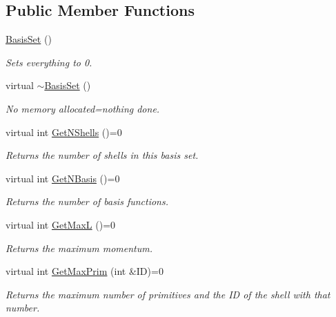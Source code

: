 \subsection*{Public Member Functions}
\begin{DoxyCompactItemize}
\item 
\hyperlink{classJKBuilder_1_1BasisSet_a902600fb65d5c4d7f7041316b1845b07}{BasisSet} ()
\begin{DoxyCompactList}\small\item\em Sets everything to 0. \item\end{DoxyCompactList}\item 
virtual \hyperlink{classJKBuilder_1_1BasisSet_acd6bebfe86051930ab0931d7d2486cce}{$\sim$BasisSet} ()
\begin{DoxyCompactList}\small\item\em No memory allocated=nothing done. \item\end{DoxyCompactList}\item 
virtual int \hyperlink{classJKBuilder_1_1BasisSet_a0eb3b46d258dffcfbc3e4db91f60f4f8}{GetNShells} ()=0
\begin{DoxyCompactList}\small\item\em Returns the number of shells in this basis set. \item\end{DoxyCompactList}\item 
virtual int \hyperlink{classJKBuilder_1_1BasisSet_a1167cdb6f1e1ba08ba6cbffa0b32ca77}{GetNBasis} ()=0
\begin{DoxyCompactList}\small\item\em Returns the number of basis functions. \item\end{DoxyCompactList}\item 
virtual int \hyperlink{classJKBuilder_1_1BasisSet_a5580c8eff6cb4242a298c15da2292fa4}{GetMaxL} ()=0
\begin{DoxyCompactList}\small\item\em Returns the maximum momentum. \item\end{DoxyCompactList}\item 
virtual int \hyperlink{classJKBuilder_1_1BasisSet_a4e5f8295f4fe1ecf1a910ae2fcb46c1f}{GetMaxPrim} (int \&ID)=0
\begin{DoxyCompactList}\small\item\em Returns the maximum number of primitives and the ID of the shell with that number. \item\end{DoxyCompactList}\item 

\end{DoxyCompactItemize}
